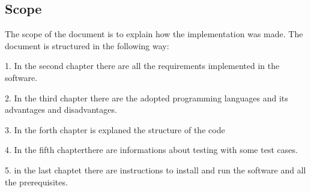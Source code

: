 \documentclass[../main.tex]{subfiles}
\begin{document}
\subsection{Scope}
The scope of the document is to explain how the implementation was made.
\newline
\newline The document is structured in the following way:
\begin{description}
	
\item 1. In the second chapter there are all the requirements implemented in the software.

\item 2. In the third chapter there are the adopted programming languages and its advantages and disadvantages.

\item 3. In the forth chapter is explaned the structure of the code

\item 4. In the fifth chapterthere are informations about testing with some test cases.

\item 5. in the last chaptet there are instructions to install and run the software and all the prerequisites.

\end{description}
\end{document}
